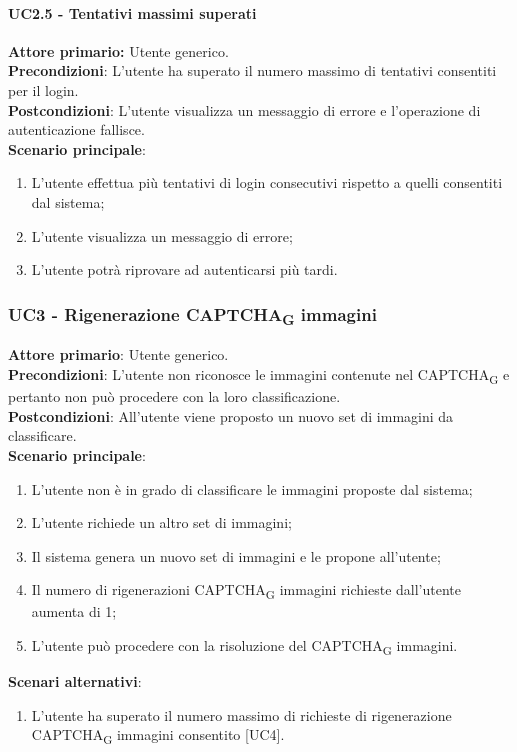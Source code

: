 \paragraph{UC2.5 - Tentativi massimi superati}
\textbf{Attore primario:} Utente generico.\\
\textbf{Precondizioni}: L'utente ha superato il numero massimo di tentativi consentiti per il login.\\
\textbf{Postcondizioni}: L’utente visualizza un messaggio di errore e l’operazione di autenticazione fallisce.\\

\textbf{Scenario principale}:
\begin{enumerate}
    \item L'utente effettua più tentativi di login consecutivi rispetto a quelli consentiti dal sistema;
	\item L’utente visualizza un messaggio di errore;
	\item L'utente potrà  riprovare ad autenticarsi più tardi.
\end{enumerate}

\subsubsection{UC3 - Rigenerazione CAPTCHA\textsubscript{G} immagini}
\textbf{Attore primario}: Utente generico.\\
\textbf{Precondizioni}: L'utente non riconosce le immagini contenute nel CAPTCHA\textsubscript{G} e pertanto non può procedere con la loro classificazione.\\
\textbf{Postcondizioni}: All'utente viene proposto un nuovo set di immagini da classificare.\\

\textbf{Scenario principale}:
\begin{enumerate}
   \item L'utente non è in grado di classificare le immagini proposte dal sistema;
   \item L'utente richiede un altro set di immagini;
   \item Il sistema genera un nuovo set di immagini e le propone all'utente;
   \item Il numero di rigenerazioni CAPTCHA\textsubscript{G} immagini richieste dall’utente aumenta di 1;
   \item L'utente può procedere con la risoluzione del CAPTCHA\textsubscript{G} immagini.
\end{enumerate}
\textbf{Scenari alternativi}:
\begin{enumerate}
   \item L'utente ha superato il numero massimo di richieste di rigenerazione CAPTCHA\textsubscript{G} immagini consentito [UC4].
\end{enumerate}

